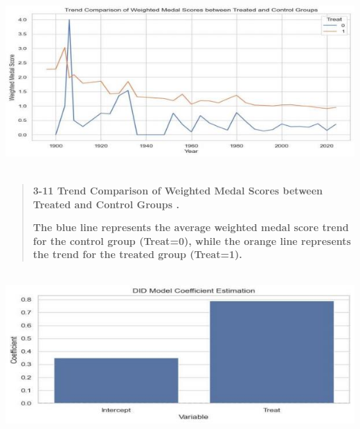 \documentclass[12pt,a4paper]{article}
\renewenvironment{quote}{\begin{quotation}}{\end{quotation}}  %
\begin{document}
    \includegraphics[width=6.30167in,height=2.71333in]{./media/media/image20.jpeg}
    
    \begin{quote}
    \textbf{3-11 Trend Comparison of Weighted Medal Scores between Treated
    and Control Groups .}
    
    \textbf{The blue line represents the average weighted medal score trend
    for the control group (Treat=0), while the orange line represents the
    trend for the treated group (Treat=1).}
    \end{quote}
    
    \includegraphics[width=6.30167in,height=2.49667in]{./media/media/image21.jpeg}
    
\end{document}
